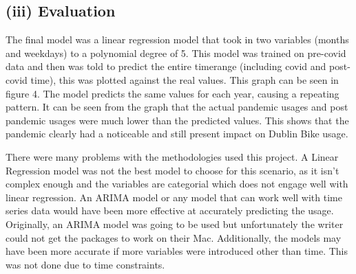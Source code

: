 \documentclass{article}
\begin{document}
\subsection{(iii) Evaluation}

The final model was a linear regression model that took in two variables (months and weekdays) to a polynomial degree of 5. This model was trained on pre-covid data and then was told to predict the entire timerange (including covid and post-covid time), this was plotted against the real values. This graph can be seen in figure 4. The model predicts the same values for each year, causing a repeating pattern. It can be seen from the graph that the actual pandemic usages and post pandemic usages were much lower than the predicted values. This shows that the pandemic clearly had a noticeable and still present impact on Dublin Bike usage.

There were many problems with the methodologies used this project. A Linear Regression model was not the best model to choose for this scenario, as it isn't complex enough and the variables are categorial which does not engage well with linear regression. An ARIMA model or any model that can work well with time series data would have been more effective at accurately predicting the usage. Originally, an ARIMA model was going to be used but unfortunately the writer could not get the packages to work on their Mac. Additionally, the models may have been more accurate if more variables were introduced other than time. This was not done due to time constraints.
\end{document}
